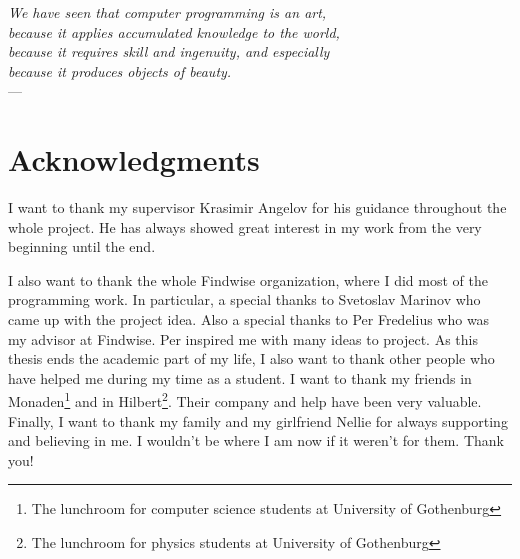 
\begin{flushright}{\slshape    
    We have seen that computer programming is an art, \\ 
    because it applies accumulated knowledge to the world, \\ 
    because it requires skill and ingenuity, and especially \\
    because it produces objects of beauty.} \\ \medskip
    ---  \citep{knuth:1974}
\end{flushright}



\bigskip

\begingroup
\let\clearpage\relax
\let\cleardoublepage\relax
\let\cleardoublepage\relax
\chapter*{Acknowledgments}
I want to thank my supervisor Krasimir Angelov for his guidance throughout the whole project. He has always showed great interest in my work from the very beginning until the end. 

I also want to thank the whole Findwise organization, where I did most of the programming work. In particular, a special thanks to Svetoslav Marinov who came up with the project idea. Also a special thanks to Per Fredelius who was my advisor at Findwise. Per inspired me with many ideas to project. 
\newline
\newline
As this thesis ends the academic part of my life, I also want to thank other people who have helped me during my time as a student.
\newline
\newline
I want to thank my friends in Monaden\footnote{The lunchroom for computer science students at University of Gothenburg} and in Hilbert\footnote{The lunchroom for physics students at University of Gothenburg}. Their company and help have been very valuable.
\newline
\newline
Finally, I want to thank my family and my girlfriend Nellie for always supporting and believing in me. I wouldn't be where I am now if it weren't for them.
\newline
\newline
\newline
\newline
Thank you!
\endgroup



